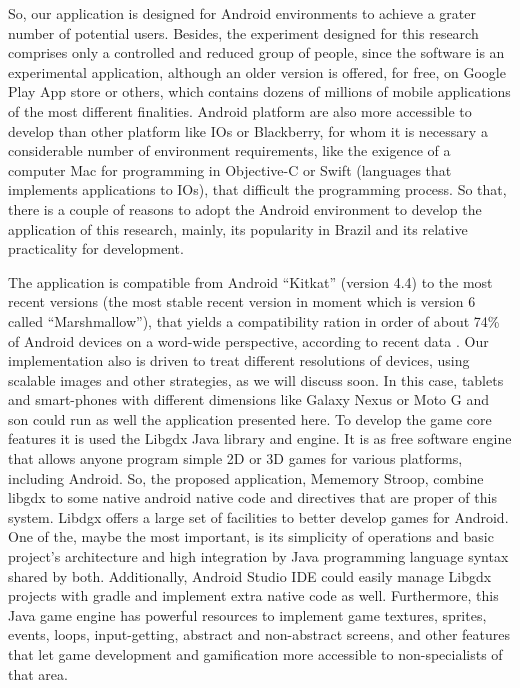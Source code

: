So, our application is designed for Android environments to achieve a grater number of potential users. Besides, the experiment designed for this research comprises only a controlled and reduced group of people, since the software is an experimental application, although an older version is offered, for free, on Google Play App store or others, which contains dozens of millions of mobile applications of the most different finalities. Android platform are also more accessible to develop than other platform like IOs or Blackberry, for whom it is necessary a considerable number of environment requirements, like the exigence of a computer Mac for programming in Objective-C or Swift (languages that implements applications to IOs), that difficult the programming process. So that, there is a couple of reasons to adopt the Android environment to develop the application of this research, mainly, its popularity in Brazil and its relative practicality for development. 

The application is compatible from Android ``Kitkat'' (version 4.4) to the most recent versions (the most stable recent version in moment which is version 6 called ``Marshmallow''), that yields a compatibility ration in order of about 74\% of Android devices on a word-wide perspective, according to recent data \citep{android-official}. Our implementation also is driven to treat different resolutions of devices, using scalable images and other strategies, as we will discuss soon. In this case, tablets and smart-phones with different dimensions like Galaxy Nexus or Moto G and son could run as well the application presented here. To develop the game core features it is used the Libgdx Java library and engine. It is as free software engine that allows anyone program simple 2D or 3D games for various platforms, including Android. So, the proposed application, Mememory Stroop, combine libgdx to some native android native code and directives that are proper of this system. Libdgx offers a large set of facilities to better develop games for Android. One of the, maybe the most important, is its simplicity of operations and basic project's architecture and high integration by Java programming language syntax shared by both. Additionally, Android Studio IDE could easily manage Libgdx projects with gradle and implement extra native code as well. Furthermore, this Java game engine has powerful resources to implement game textures, sprites, events, loops, input-getting, abstract and non-abstract screens, and other features that let game development and gamification more accessible to non-specialists of that area.

